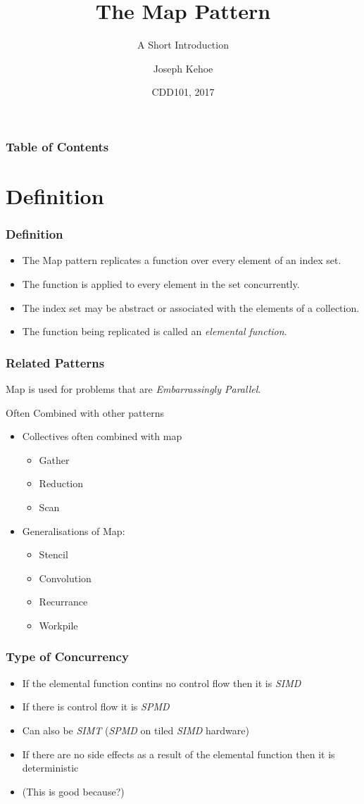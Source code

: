 \documentclass{beamer}
\title[The Map Pattern] %
{The Map Pattern}
\subtitle{A Short Introduction}
\author[Dr. Joseph Kehoe] %
{Joseph Kehoe\inst{1}}
\institute[IT Carlow] %
{
	\inst{1}%
	Department of Computing and Networking\\
	Institute of Technology Carlow
}
\date[ITC 2017] %
{CDD101, 2017}
\begin{document}
 
\frame{\titlepage}
 
 
 
 \begin{frame}
 	\frametitle{Table of Contents}
 	\tableofcontents
 \end{frame}
 
 
 \section{Definition}
\begin{frame}
\frametitle{Definition}

\begin{itemize}
	\item The Map pattern replicates a function over every element of an index set.
	\item The function is applied to every element in the set concurrently.
	\item The index set may be abstract or associated with the elements of a collection.
	\item The function being replicated is called  an \emph{elemental function}.
\end{itemize}
\end{frame}

\begin{frame}
	\frametitle{Related Patterns}
Map is used for problems that are \emph{Embarrassingly Parallel}.

Often Combined with other patterns

\begin{itemize}
	\item Collectives often combined with map
	\begin{itemize}
		\item Gather
		\item Reduction
		\item Scan
	\end{itemize}
	\item Generalisations of Map:
	\begin{itemize}
		\item Stencil
		\item Convolution
		\item Recurrance
		\item Workpile
	\end{itemize}
\end{itemize}
\end{frame}

\begin{frame}
	\frametitle{Type of Concurrency}
\begin{itemize}
	\item If the elemental function contins no control flow then it is \emph{SIMD}
	\item If there is control flow it is  \emph{SPMD}
	\item Can also be \emph{SIMT} (\emph{SPMD} on tiled \emph{SIMD} hardware)
	\item If there are no side effects as a result of the elemental function then it is deterministic
	\item (This is good because?)
\end{itemize}
\end{frame}
\end{document}
